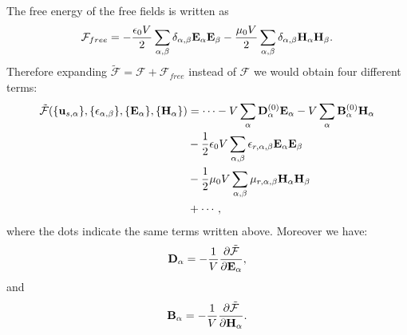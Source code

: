 \documentclass[12pt,a4paper]{article}
\begin{document}
The free energy of the free fields is written as
\begin{equation}
\mathcal{F}_{free}=-{\epsilon_0 V \over 2} \sum_{\alpha,\beta} 
\delta_{\alpha,\beta} {\bf E}_\alpha {\bf E}_\beta-
{\mu_0 V \over 2} \sum_{\alpha,\beta} 
\delta_{\alpha,\beta} {\bf H}_\alpha {\bf H}_\beta.
\end{equation}
Therefore expanding $\mathcal{\tilde F} = \mathcal{F} + \mathcal{F}_{free}$
instead of $\mathcal{F}$ we would obtain four different terms:
\begin{align}
\mathcal{\tilde F}(\{{\bf u}_{s,\alpha}\}, \{\epsilon_{\alpha,\beta}\},
\{ {\bf E}_\alpha\}, \{{\bf H}_\alpha\})&= \cdots -
V \sum_{\alpha} {\bf D}^{(0)}_\alpha {\bf E}_\alpha - 
V \sum_{\alpha} {\bf B}^{(0)}_\alpha {\bf H}_\alpha \nonumber \\
&- {1\over 2} \epsilon_0 V \sum_{\alpha,\beta} 
\epsilon_{r,\alpha,\beta}
{\bf E}_{\alpha}
{\bf E}_{\beta} \nonumber \\
&- {1\over 2} \mu_0 V \sum_{\alpha,\beta} 
\mu_{r,\alpha,\beta}
{\bf H}_{\alpha}
{\bf H}_{\beta} \nonumber \\
&+ \cdots,
\end{align}
where the dots indicate the same terms written above.
Moreover we have:
\begin{equation}
{\bf D}_\alpha = -{1\over V} {\partial \mathcal{\tilde F} \over 
\partial {\bf E}_\alpha},
\end{equation}
and
\begin{equation}
{\bf B}_\alpha = -{1\over V} {\partial \mathcal{\tilde F} \over 
\partial {\bf H}_\alpha}.
\end{equation}
\\
\end{document}
